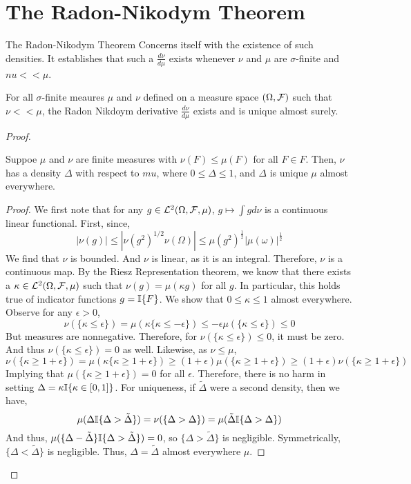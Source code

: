 \section{The Radon-Nikodym Theorem}

The Radon-Nikodym Theorem Concerns itself with the existence of such densities. It establishes that 
such a $\frac{d\nu}{d\mu}$ exists whenever $\nu$ and $\mu$ are $\sigma$-finite and 
$nu << \mu$. 

\begin{theorem}
    For all $\sigma$-finite meaures $\mu$ and $\nu$ defined on a measure space 
    $(\Omega, \mathcal F)$ such that $\nu << \mu$, the Radon Nikdoym derivative $\frac{d\nu}{d\mu}$ exists 
    and is unique almost surely.
\end{theorem}
\begin{proof}

    \begin{lemma} 
        Suppoe $\mu$ and $\nu$ are finite measures with $\nu(F) \leq \mu(F)$ for all 
        $F \in F$. Then, $\nu$ has a density $\Delta$ with respect to $mu$, where 
        $0 \leq \Delta \leq 1$, and $\Delta$ is unique $\mu$ almost everywhere.
    \end{lemma}
    \begin{proof}
        We first note that for any $g \in \mathcal L^2(\Omega, \mathcal F, \mu)$, $g \mapsto \int g d\nu$ is a continuous linear functional. 
        First, since, 
        \[ |\nu(g)| \leq |\nu(g^2)^{1/2}\nu(\Omega)| \leq \mu(g^2)^\frac{1}{2} |\mu(\omega)|^\frac{1}{2}  \]
        We find that $\nu$ is bounded. And $\nu$ is linear, as it is an integral. Therefore, 
        $\nu$ is a continuous map. By the Riesz Representation theorem, we know that there exists a 
        $\kappa \in \mathcal L^2(\Omega, \mathcal F, \mu)$ such that $\nu(g) = \mu(\kappa g)$ for all $g$. In particular, 
        this holds true of indicator functions $g = \mathbb I\{F\}$. We show that 
        $0 \leq \kappa \leq 1$ almost everywhere. Observe for any $\epsilon > 0$,
        \[\nu(\{\kappa \leq \epsilon\}) = \mu(\kappa\{\kappa \leq -\epsilon\}) \leq -\epsilon \mu(\{\kappa \leq \epsilon\}) \leq 0 \] 
        But measures are nonnegative. Therefore, for $\nu(\{\kappa \leq \epsilon\}) \leq 0$, it must be zero. And thus 
        $\nu(\{\kappa \leq \epsilon\}) = 0$ as well. Likewise, as $\nu \leq \mu$, 
        \[ \nu(\{\kappa \geq 1 + \epsilon \}) = \mu(\kappa\{\kappa \geq 1 + \epsilon\}) \geq (1 + \epsilon)\mu(\{\kappa \geq 1 + \epsilon\}) \geq (1 + \epsilon)\nu(\{\kappa \geq 1 + \epsilon\}) \] 
        Implying that $\mu(\{\kappa \geq 1 + \epsilon\}) = 0$ for all $\epsilon$. Therefore, there is no harm in setting 
        $\Delta = \kappa\mathbb I\{\kappa \in [0,1]\}$. For uniqueness, if $\tilde{\Delta}$ were a second density, then we have, 
        \[  \mu(\Delta\mathbb I\{\Delta > \tilde{\Delta}\}) = \nu(\{\Delta > \Delta\}) =  \mu(\tilde{\Delta}\mathbb I\{\Delta > \Delta\}) \]
        And thus, $\mu(\{\Delta - \tilde{\Delta}\}\mathbb I\{\Delta > \tilde{\Delta}\}) = 0$, so $\{\Delta > \tilde{\Delta}\}$ is negligible. 
        Symmetrically, $\{\Delta < \tilde{\Delta}\}$ is negligible. Thus, $\Delta = \tilde{\Delta}$ almost everywhere $\mu$.


\end{proof}
\end{proof}
